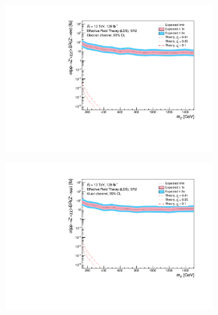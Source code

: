 \documentclass[12pt, a4paper]{book}
\begin{document}
\begin{figure}[!ht]
\begin{subfigure}[b]{0.49\textwidth}
   \end{subfigure}
   \hfill
   \begin{subfigure}[b]{0.49\textwidth}
      \centering
      \includegraphics[width=1\textwidth]{Limits/Model_independent/100-150/EFT_LDS/mass_exclusion_ee.pdf}
   \end{subfigure}
   \hfill
   \begin{subfigure}[b]{0.49\textwidth}
      \centering
      \includegraphics[width=1\textwidth]{Limits/Model_independent/100-150/EFT_LDS/mass_exclusion_uu.pdf}
   \end{subfigure}
   \hfill
	\begin{subfigure}[b]{0.49\textwidth}
      \centering

\end{subfigure}
\end{figure}
\end{document}
